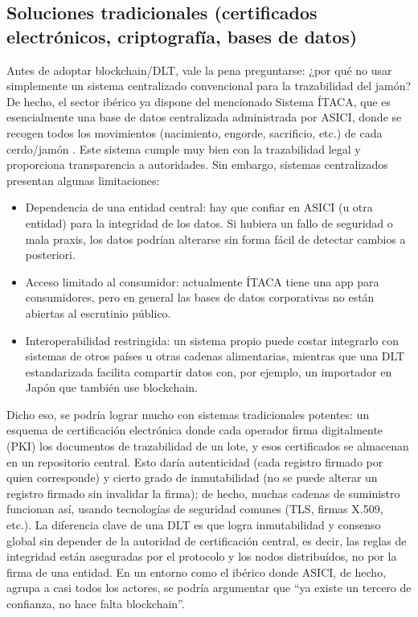 \subsection{Soluciones tradicionales (certificados electrónicos, criptografía, bases de datos)}
Antes de adoptar blockchain/DLT, vale la pena preguntarse: ¿por qué no usar simplemente un sistema centralizado convencional para la trazabilidad del jamón? De hecho, el sector ibérico ya dispone del mencionado Sistema ÍTACA, que es esencialmente una base de datos centralizada administrada por ASICI, donde se recogen todos los movimientos (nacimiento, engorde, sacrificio, etc.) de cada cerdo/jamón \cite{noauthor_sistema_nodate} \cite{noauthor_sello_nodate}. Este sistema cumple muy bien con la trazabilidad legal y proporciona transparencia a autoridades. Sin embargo, sistemas centralizados presentan algunas limitaciones:
\begin{itemize}
    \item Dependencia de una entidad central: hay que confiar en ASICI (u otra entidad) para la integridad de los datos. Si hubiera un fallo de seguridad o mala praxis, los datos podrían alterarse sin forma fácil de detectar cambios a posteriori.
    \item Acceso limitado al consumidor: actualmente ÍTACA tiene una app para consumidores, pero en general las bases de datos corporativas no están abiertas al escrutinio público.
    \item Interoperabilidad restringida: un sistema propio puede costar integrarlo con sistemas de otros países u otras cadenas alimentarias, mientras que una DLT estandarizada facilita compartir datos con, por ejemplo, un importador en Japón que también use blockchain.
\end{itemize}

Dicho eso, se podría lograr mucho con sistemas tradicionales potentes: un esquema de certificación electrónica donde cada operador firma digitalmente (PKI) los documentos de trazabilidad de un lote, y esos certificados se almacenan en un repositorio central. Esto daría autenticidad (cada registro firmado por quien corresponde) y cierto grado de inmutabilidad (no se puede alterar un registro firmado sin invalidar la firma); de hecho, muchas cadenas de suministro funcionan así, usando tecnologías de seguridad comunes (TLS, firmas X.509, etc.). La diferencia clave de una DLT es que logra inmutabilidad y consenso global sin depender de la autoridad de certificación central, es decir, las reglas de integridad están aseguradas por el protocolo y los nodos distribuídos, no por la firma de una entidad. En un entorno como el ibérico donde ASICI, de hecho, agrupa a casi todos los actores, se podría argumentar que “ya existe un tercero de confianza, no hace falta blockchain”.

